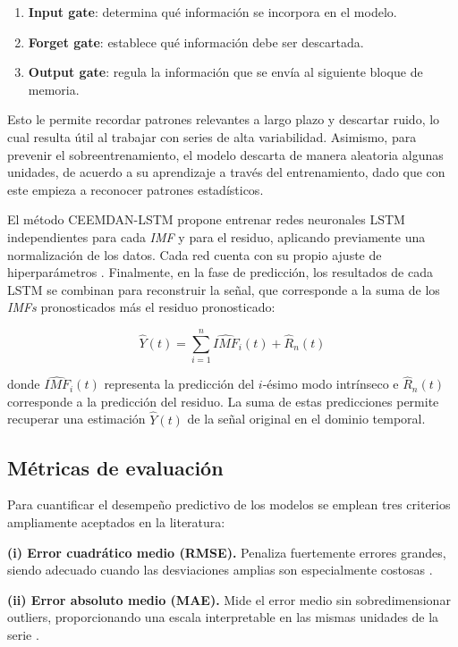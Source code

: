 \documentclass[12pt]{paper}
\begin{document}
\begin{enumerate}
    \item \textbf{Input gate}: determina qué información se incorpora en el modelo.
    \item \textbf{Forget gate}: establece qué información debe ser descartada.
    \item \textbf{Output gate}: regula la información que se envía al siguiente bloque de memoria.
\end{enumerate}

Esto le permite recordar patrones relevantes a largo plazo y descartar ruido, lo cual resulta útil al trabajar con series de alta variabilidad. Asimismo, para prevenir el sobreentrenamiento, el modelo descarta de manera aleatoria algunas unidades, de acuerdo a su aprendizaje a través del entrenamiento, dado que con este empieza a reconocer patrones estadísticos.

El método CEEMDAN-LSTM propone entrenar redes neuronales LSTM independientes para cada \textit{IMF} y para el residuo, aplicando previamente una normalización de los datos. Cada red cuenta con su propio ajuste de hiperparámetros \cite{cao2019financial}. Finalmente, en la fase de predicción, los resultados de cada LSTM se combinan para reconstruir la señal, que corresponde a la suma de los \textit{IMFs} pronosticados más el residuo pronosticado:

\begin{equation}
 \hat{Y}(t) = \sum_{i=1}^{n} \widehat{IMF}_i(t) + \widehat{R}_n(t)
\end{equation}

donde $\widehat{IMF}_i(t)$ representa la predicción del $i$-ésimo modo intrínseco e $\widehat{R}_n(t)$ corresponde a la predicción del residuo. La suma de estas predicciones permite recuperar una estimación $\hat{Y}(t)$ de la señal original en el dominio temporal.

\subsection{Métricas de evaluación}

Para cuantificar el desempeño predictivo de los modelos se emplean tres criterios ampliamente aceptados en la literatura:

\textbf{(i) Error cuadrático medio (RMSE).} Penaliza fuertemente errores grandes, siendo adecuado cuando las desviaciones amplias son especialmente costosas \cite{chai2014root}.

\textbf{(ii) Error absoluto medio (MAE).} Mide el error medio sin sobredimensionar outliers, proporcionando una escala interpretable en las mismas unidades de la serie \cite{willmott2005advantages}.
\end{document}

